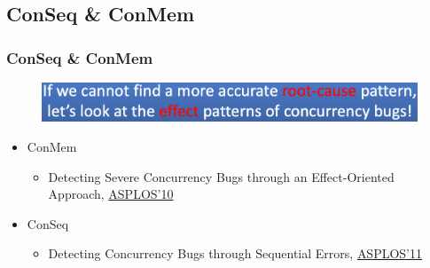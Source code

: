 \subsection{ConSeq \& ConMem} %
\begin{frame}[fragile]
    \frametitle{ConSeq \& ConMem}
    \begin{figure}
    \includegraphics[width=0.85\linewidth]{figs/ConSeq-idea.png}
    \end{figure} \pause

    \begin{itemize}
	    \item ConMem
    	\begin{itemize}
    	    \item Detecting Severe Concurrency Bugs through an Effect-Oriented Approach, \href{https://people.cs.uchicago.edu/~shanlu/paper/asplos184-zhang.pdf}{ASPLOS’10}
    	\end{itemize} \pause
	    \item ConSeq
    	\begin{itemize}
    	    \item Detecting Concurrency Bugs through Sequential Errors, \href{https://research.cs.wisc.edu/wpis/papers/asplos11.pdf}{ASPLOS’11}
    	\end{itemize}
	\end{itemize}
\end{frame}

